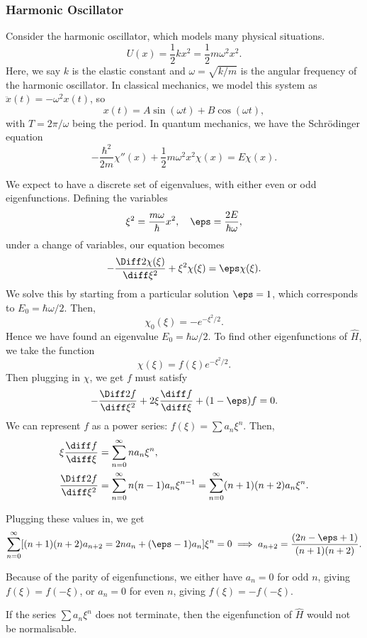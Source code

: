 \documentclass[12pt]{article}
\begin{document}
\subsubsection{Harmonic Oscillator}%
\label{subsub:harmonic_oscillator}

Consider the harmonic oscillator, which models many physical situations.
\[
	U(x) = \frac{1}{2}k x^2 = \frac{1}{2}m \omega^2 x^2
.\]
Here, we say $k$ is the elastic constant and $\omega = \sqrt{k/m}$ is the angular frequency of the harmonic oscillator. In classical mechanics, we model this system as $\ddot x (t) = - \omega^2 x(t)$, so
\[
	x(t) = A \sin (\omega t) + B \cos (\omega t)
,\]
with $T = 2\pi/\omega$ being the period. In quantum mechanics, we have the Schr\"{o}dinger equation
\[
	- \frac{\hbar^2}{2m} \chi''(x) + \frac{1}{2} m \omega^2 x^2 \chi(x) =  E \chi(x)
.\]

We expect to have a discrete set of eigenvalues, with either even or odd eigenfunctions. Defining the variables
\[
\xi^2 = \frac{m \omega}{\hbar} x^2, \quad \eps = \frac{2E}{\hbar \omega}
,\]
under a change of variables, our equation becomes
\[
	- \frac{\Diff2 \chi(\xi)}{\diff \xi^2} + \xi^2 \chi(\xi) = \eps \chi(\xi)
.\]
We solve this by starting from a particular solution $\eps = 1$, which corresponds to $E_0 = \hbar \omega/2$. Then,
\[
	\chi_0(\xi) = - e^{-\xi^2/2}
.\]
Hence we have found an eigenvalue $E_0 = \hbar \omega/2$. To find other eigenfunctions of $\hat H$, we take the function
\[
	\chi(\xi) = f(\xi) e^{-\xi^2/2}
.\]
Then plugging in $\chi$, we get $f$ must satisfy
\[
	- \frac{\Diff2 f}{\diff \xi^2} + 2 \xi \frac{\diff f}{\diff \xi} + (1 - \eps)f = 0
.\]
We can represent $f$ as a power series: $f(\xi) = \sum a_n \xi^{n}$. Then,
\begin{align*}
	\xi \frac{\diff f}{\diff \xi} &= \sum_{n = 0}^{\infty} n a_n \xi^{n}, \\
	\frac{\Diff2 f}{\diff \xi^2} &= \sum_{n = 0}^{\infty}n(n-1)a_n \xi^{n-1} = \sum_{n = 0}^{\infty}(n+1)(n+2)a_n \xi^{n}.
\end{align*}

Plugging these values in, we get
\[
	\sum_{n = 0}^{\infty} [(n+1)(n+2)a_{n+2} = 2 na_n + (\eps - 1)a_n]\xi^{n} = 0 \implies a_{n+2} = \frac{(2n - \eps + 1)}{(n+1)(n+2)}
.\]

Because of the parity of eigenfunctions, we either have $a_n = 0$ for odd $n$, giving $f(\xi) = f(-\xi)$, or $a_n = 0$ for even $n$, giving $f(\xi) = -f(-\xi)$.

\begin{proposition}
	If the series $\sum a_n \xi^{n}$ does not terminate, then the eigenfunction of $\hat H$ would not be normalisable.
\end{proposition}
\end{document}

